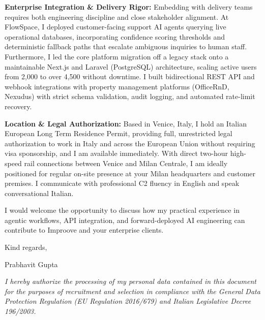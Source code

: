 \documentclass[10.5pt,a4paper]{article}
\begin{document}
\textbf{Enterprise Integration \& Delivery Rigor:} Embedding with delivery teams requires both engineering discipline and close stakeholder alignment. At FlowSpace, I deployed customer-facing support AI agents querying live operational databases, incorporating confidence scoring thresholds and deterministic fallback paths that escalate ambiguous inquiries to human staff. Furthermore, I led the core platform migration off a legacy stack onto a maintainable Next.js and Laravel (PostgreSQL) architecture, scaling active users from 2,000 to over 4,500 without downtime. I built bidirectional REST API and webhook integrations with property management platforms (OfficeRnD, Nexudus) with strict schema validation, audit logging, and automated rate-limit recovery.

\textbf{Location \& Legal Authorization:} Based in Venice, Italy, I hold an Italian European Long Term Residence Permit, providing full, unrestricted legal authorization to work in Italy and across the European Union without requiring visa sponsorship, and I am available immediately. With direct two-hour high-speed rail connections between Venice and Milan Centrale, I am ideally positioned for regular on-site presence at your Milan headquarters and customer premises. I communicate with professional C2 fluency in English and speak conversational Italian.

I would welcome the opportunity to discuss how my practical experience in agentic workflows, API integration, and forward-deployed AI engineering can contribute to Improove and your enterprise clients.

Kind regards,

Prabhavit Gupta

\vspace{0.4em}
{\footnotesize \textit{I hereby authorize the processing of my personal data contained in this document for the purposes of recruitment and selection in compliance with the General Data Protection Regulation (EU Regulation 2016/679) and Italian Legislative Decree 196/2003.}\par}
\end{document}
